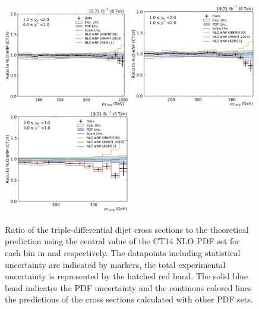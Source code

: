 \begin{figure}[htbp]
    \includegraphics[width=0.49\textwidth]{figures/measurement/ratio_to_CT14nlo+np_totcomp_yb1ys0.pdf}
    \includegraphics[width=0.49\textwidth]{figures/measurement/ratio_to_CT14nlo+np_totcomp_yb1ys1.pdf}\hfill
    \includegraphics[width=0.49\textwidth]{figures/measurement/ratio_to_CT14nlo+np_totcomp_yb2ys0.pdf}
    \caption[Ratio of the cross section to CT14 NLO]{
    Ratio of the triple-differential dijet cross sections to the theoretical
    prediction using the central value of the CT14 NLO PDF set for each bin in \ystar
    and \yboost respectively. The datapoints including statistical uncertainty are
    indicated by markers, the total experimental uncertainty is represented by the
    hatched red band. The solid blue band indicates the PDF uncertainty and the
    continous colored lines the predictions of the cross sections calculated with
    other PDF sets.}
    \label{fig:ratio_ct14_nlo}
\end{figure}

